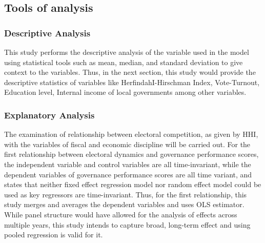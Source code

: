 \subsection{Tools of analysis}
\subsubsection{Descriptive Analysis}
This study performs the descriptive analysis of the variable used in the model using statistical tools such as mean, median, and standard deviation to give context to the variables. Thus, in the next section, this study would provide the descriptive statistics of variables like HerfindahI-Hirschman Index, Vote-Turnout, Education level, Internal income of local governments among other variables.
\subsubsection{Explanatory Analysis}
The examination of relationship between electoral competition, as given by HHI, with the variables of fiscal and economic discipline will be carried out. For the first relationship between electoral dynamics and governance performance scores,  the independent variable and control variables are all time-invariant, while the dependent variables of governance performance scores are all time variant,  and  states that neither fixed effect regression model nor random effect model could be used as key regressors are time-invariant. Thus, for the first relationship, this study merges and averages the dependent variables and uses OLS estimator. While panel structure would have allowed for the analysis of effects across multiple years, this study intends to capture broad, long-term effect and using pooled regression is valid for it.
\vspace{-4mm}
